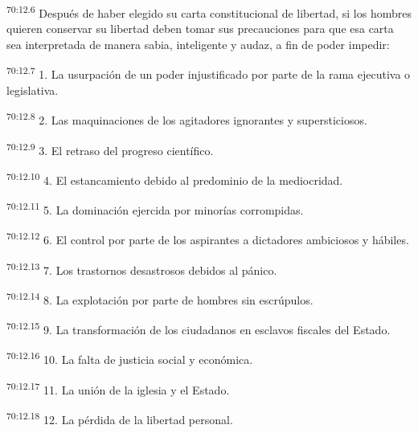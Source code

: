 \documentclass[twoside, 11pt]{book}
\begin{document}
\par
\textsuperscript{70:12.6} Después de haber elegido su carta constitucional de libertad, si los hombres quieren conservar su libertad deben tomar sus precauciones para que esa carta sea interpretada de manera sabia, inteligente y audaz, a fin de poder impedir:

\par
\textsuperscript{70:12.7} 1. La usurpación de un poder injustificado por parte de la rama ejecutiva o legislativa.

\par
\textsuperscript{70:12.8} 2. Las maquinaciones de los agitadores ignorantes y supersticiosos.

\par
\textsuperscript{70:12.9} 3. El retraso del progreso científico.

\par
\textsuperscript{70:12.10} 4. El estancamiento debido al predominio de la mediocridad.

\par
\textsuperscript{70:12.11} 5. La dominación ejercida por minorías corrompidas.

\par
\textsuperscript{70:12.12} 6. El control por parte de los aspirantes a dictadores ambiciosos y hábiles.

\par
\textsuperscript{70:12.13} 7. Los trastornos desastrosos debidos al pánico.

\par
\textsuperscript{70:12.14} 8. La explotación por parte de hombres sin escrúpulos.

\par
\textsuperscript{70:12.15} 9. La transformación de los ciudadanos en esclavos fiscales del Estado.

\par
\textsuperscript{70:12.16} 10. La falta de justicia social y económica.

\par
\textsuperscript{70:12.17} 11. La unión de la iglesia y el Estado.

\par
\textsuperscript{70:12.18} 12. La pérdida de la libertad personal.
\end{document}
